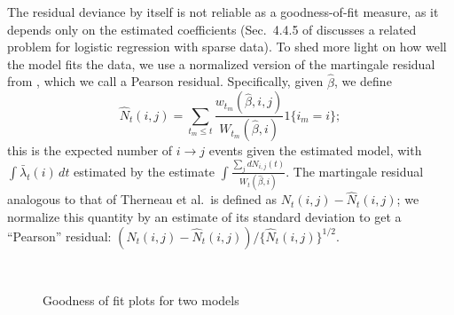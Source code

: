 \documentclass[final]{statsoc}
\begin{document}
The residual deviance by itself is not reliable as a goodness-of-fit measure,
as it depends only on the estimated coefficients (Sec.~4.4.5 of
\cite{mccullagh1989generalized} discusses a related problem for logistic
regression with sparse data).  To shed more light on how well the model fits
the data, we use a normalized version of the martingale residual from
\cite{therneau1990martingale}, which we call a Pearson residual.
Specifically, given $\hat \beta$, we define
\[
  \hat N_{t}(i,j)
    = \sum_{t_m \leq t}
        \frac{w_{t_m}(\hat \beta, i, j)}{W_{t_m}(\hat \beta, i)}
        1\{i_m = i\};
\]
this is the expected number of $i \to j$ events given the estimated model,
with $\int \bar \lambda_t(i) \, dt$ estimated by the
\cite{breslow1974covariance} estimate $\int \frac{\sum_j dN_{i,j}(t)}{W_t(\hat
\beta, i)}$.  The martingale residual analogous to that of Therneau et al.\ is
defined as $N_t(i,j) - \hat N_t(i,j)$; we normalize this quantity by an
estimate of its standard deviation to get a ``Pearson'' residual:
\(
    {(N_t(i,j) - \hat N_t(i,j))}/\{\hat N_t(i,j)\}^{1/2}.
\)


\begin{figure}[h]
  \centering
  \\
  \caption{\label{F:goodness}
    Goodness of fit plots for two models
  }
\end{figure}
\end{document}
